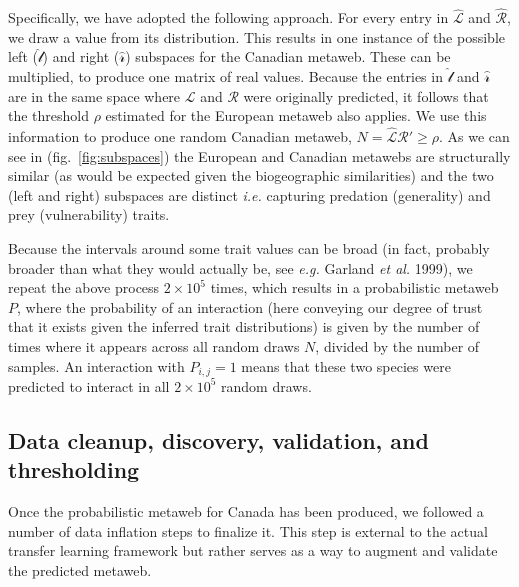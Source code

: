 \documentclass[11pt]{article}
\begin{document}
Specifically, we have adopted the following approach. For every entry in
\(\hat{\mathscr{L}}\) and \(\hat{\mathscr{R}}\), we draw a value from
its distribution. This results in one instance of the possible left
(\(\hat{\mathscr{l}}\)) and right (\(\hat{\mathscr{r}}\)) subspaces for
the Canadian metaweb. These can be multiplied, to produce one matrix of
real values. Because the entries in \(\hat{\mathscr{l}}\) and
\(\hat{\mathscr{r}}\) are in the same space where \(\mathscr{L}\) and
\(\mathscr{R}\) were originally predicted, it follows that the threshold
\(\rho\) estimated for the European metaweb also applies. We use this
information to produce one random Canadian metaweb,
\(N = \hat{\mathscr{L}}\)\(\hat{\mathscr{R}}' \ge \rho\). As we can see
in (fig.~\ref{fig:subspaces}) the European and Canadian metawebs are
structurally similar (as would be expected given the biogeographic
similarities) and the two (left and right) subspaces are distinct
\emph{i.e.} capturing predation (generality) and prey (vulnerability)
traits.

Because the intervals around some trait values can be broad (in fact,
probably broader than what they would actually be, see \emph{e.g.}
Garland \emph{et al.} 1999), we repeat the above process
\(2\times 10^5\) times, which results in a probabilistic metaweb \(P\),
where the probability of an interaction (here conveying our degree of
trust that it exists given the inferred trait distributions) is given by
the number of times where it appears across all random draws \(N\),
divided by the number of samples. An interaction with \(P_{i,j} = 1\)
means that these two species were predicted to interact in all
\(2\times 10^5\) random draws.

\hypertarget{data-cleanup-discovery-validation-and-thresholding}{%
\subsection{Data cleanup, discovery, validation, and
thresholding}\label{data-cleanup-discovery-validation-and-thresholding}}

Once the probabilistic metaweb for Canada has been produced, we followed
a number of data inflation steps to finalize it. This step is external
to the actual transfer learning framework but rather serves as a way to
augment and validate the predicted metaweb.
\end{document}
